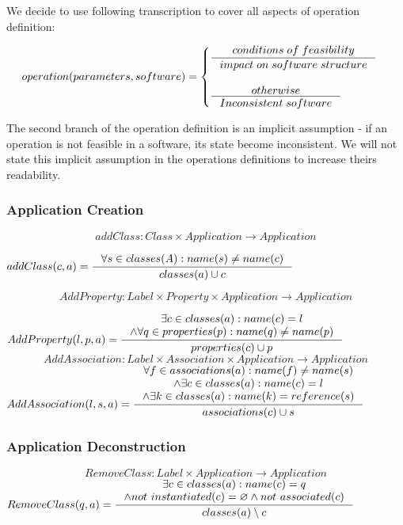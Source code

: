 \documentclass[11pt]{article}
\begin{document}
We decide to use following transcription to cover all aspects  of operation definition:

\begin{equation*}
\begin{gathered}
operation(parameters, software) = \begin{cases}
  \inference{conditions \; of \; feasibility}{impact \; on \; software \; structure}\\ \\
  \inference{otherwise}{Inconsistent \; software}
 \end{cases}
\end{gathered}
\end{equation*}

The second branch of the operation definition is an implicit assumption - if an operation is not feasible in a software, its state become inconsistent. We will not state this implicit assumption in the operations definitions to increase theirs readability.


\subsubsection{Application Creation}
$$addClass: Class \times Application \rightarrow Application $$

$
addClass(c, a) = \inference{\forall s \in classes(A) : name(s) \neq name(c)}
{classes(a) \cup c}
$

$$AddProperty : Label \times Property \times Application \rightarrow Application $$

$
AddProperty(l, p, a) = \inference{\exists c \in classes(a) : name(c) = l \\ \wedge \forall q \in  properties(p) : name(q) \neq name(p)}{properties(c) \cup p }
$
$$AddAssociation : Label \times Association \times Application \rightarrow Application $$
$
AddAssociation(l, s, a) = \inference{\forall f \in associations(a) : name(f) \neq name(s) \\ \wedge \exists c \in classes(a) : name(c) = l \\ \wedge \exists k \in classes(a) : name(k) = reference(s) }{associations(c) \cup s}
$

\subsubsection{Application Deconstruction}
$$RemoveClass: Label \times Application \rightarrow Application $$
$
RemoveClass(q, a) = \inference{\exists c \in classes(a) : name(c) = q \\
\wedge not$ $instantiated(c) = \varnothing \wedge not$ $associated(c)}{classes(a) \setminus c }
$
\end{document}
